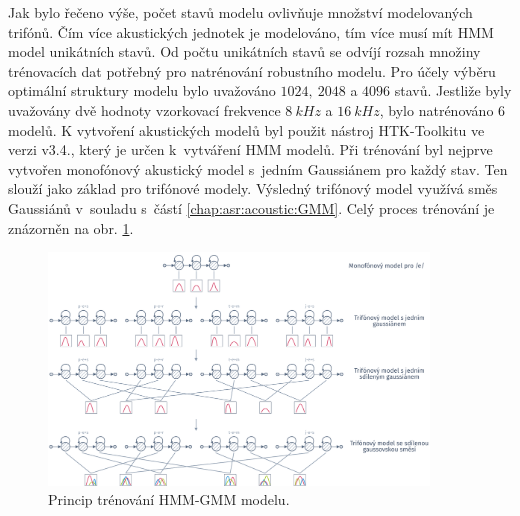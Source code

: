 Jak bylo řečeno výše, počet stavů modelu ovlivňuje množství modelovaných trifónů.
Čím více akustických jednotek je modelováno, tím více musí mít HMM model unikátních stavů.
Od počtu unikátních stavů se odvíjí rozsah množiny trénovacích dat potřebný pro  natrénování robustního modelu.
Pro účely výběru optimální struktury modelu bylo uvažováno $1024,\ 2048$ a $4096$ stavů.
Jestliže byly uvažovány dvě hodnoty vzorkovací frekvence $8\ kHz$ a $16\ kHz$, bylo natrénováno $6$ modelů.
K vytvoření akustických modelů byl použit nástroj HTK-Toolkitu ve verzi v3.4., který je určen  k~vytváření HMM modelů.
Při trénování byl nejprve vytvořen monofónový akustický model s~jedním Gaussiánem pro každý stav.
Ten slouží jako základ pro trifónové modely.
Výsledný trifónový model využívá směs Gaussiánů v~souladu s~částí \ref{chap:asr:acoustic:GMM}.
Celý proces trénování je znázorněn na obr. \ref{fig:construction:results:baseline:hmm:training}.

\begin{figure}[hbpt]
  \centering
  \includegraphics[width=0.9\textwidth]{./ch5-construction/img/hmm-training.pdf}
  \caption{Princip trénování HMM-GMM modelu.}
  \label{fig:construction:results:baseline:hmm:training}
\end{figure}

